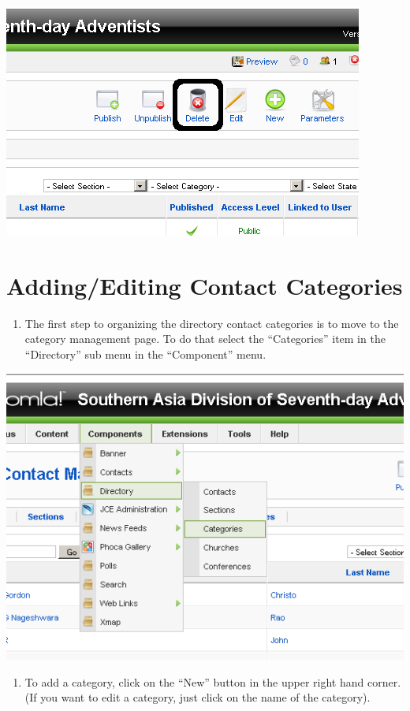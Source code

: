 \documentclass[letterpaper,10pt,english]{manual}
\begin{document}
{\hfill\includegraphics{directoryContactsDeleteButton1.png}\hfill}

\section{Adding/Editing Contact Categories}
\begin{enumerate}
\item {} 
The first step to organizing the directory contact categories is to move to the category management page.  To do that select the “Categories” item in the “Directory” sub menu in the “Component” menu.

\end{enumerate}

{\hfill\includegraphics{directoryContactCategoriesAccess1.png}\hfill}
\begin{enumerate}
\item {} 
To add a category, click on the “New” button in the upper right hand corner.  (If you want to edit a category, just click on the name of the category).

\end{enumerate}
\end{document}
